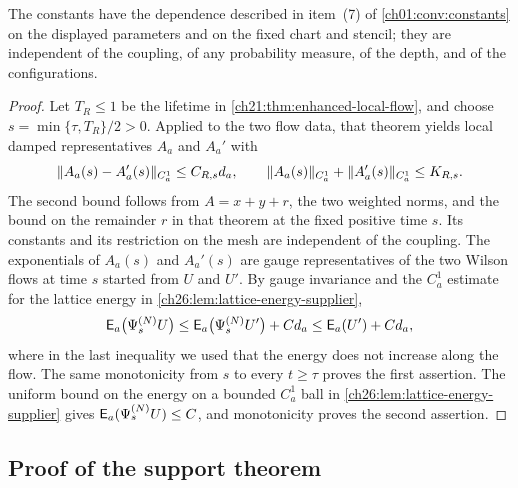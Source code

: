 The constants have the dependence described in item~(7) of \cref{ch01:conv:constants} on the displayed parameters and on the fixed chart and stencil; they are independent of the coupling, of any probability measure, of the depth, and of the configurations.

\begin{proof}
Let $T_R\le1$ be the lifetime in \cref{ch21:thm:enhanced-local-flow}, and choose $s=\min\{\tau,T_R\}/2>0$. Applied to the two flow data, that theorem yields local damped representatives $A_a$ and $A_a'$ with
\[
 \lVert A_a(s)-A_a'(s)\rVert_{C_a^1}\le C_{R,s}d_a,\qquad\lVert A_a(s)\rVert_{C_a^1}+\lVert A_a'(s)\rVert_{C_a^1}\le K_{R,s}.
\]
The second bound follows from $A=x+y+r$, the two weighted norms, and the bound on the remainder $r$ in that theorem at the fixed positive time $s$. Its constants and its restriction on the mesh are independent of the coupling. The exponentials of $A_a(s)$ and $A_a'(s)$ are gauge representatives of the two Wilson flows at time $s$ started from $U$ and $U'$. By gauge invariance and the $C_a^1$ estimate for the lattice energy in \cref{ch26:lem:lattice-energy-supplier},
\[
 \mathsf E_a\bigl(\Psi^{(N)}_sU\bigr)\le\mathsf E_a\bigl(\Psi^{(N)}_sU'\bigr)+Cd_a\le\mathsf E_a(U')+Cd_a,
\]
where in the last inequality we used that the energy does not increase along the flow. The same monotonicity from $s$ to every $t\ge\tau$ proves the first assertion. The uniform bound on the energy on a bounded $C_a^1$ ball in \cref{ch26:lem:lattice-energy-supplier} gives $\mathsf E_a(\Psi^{(N)}_sU)\le C$, and monotonicity proves the second assertion.
\end{proof}

\subsection{Proof of the support theorem}

